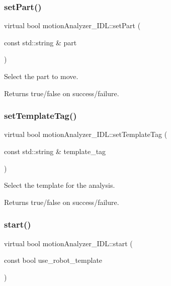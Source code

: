 \subsubsection{\texorpdfstring{set\+Part()}{setPart()}}
{\footnotesize\ttfamily virtual bool motion\+Analyzer\+\_\+\+I\+D\+L\+::set\+Part (\begin{DoxyParamCaption}\item[{const std\+::string \&}]{part }\end{DoxyParamCaption})\hspace{0.3cm}{\ttfamily [virtual]}}



Select the part to move. 

\begin{DoxyReturn}{Returns}
true/false on success/failure. 
\end{DoxyReturn}
\mbox{\label{classmotionAnalyzer__IDL_a60012ac489f03d4bd8fb272c557b0144}} 
\subsubsection{\texorpdfstring{set\+Template\+Tag()}{setTemplateTag()}}
{\footnotesize\ttfamily virtual bool motion\+Analyzer\+\_\+\+I\+D\+L\+::set\+Template\+Tag (\begin{DoxyParamCaption}\item[{const std\+::string \&}]{template\+\_\+tag }\end{DoxyParamCaption})\hspace{0.3cm}{\ttfamily [virtual]}}



Select the template for the analysis. 

\begin{DoxyReturn}{Returns}
true/false on success/failure. 
\end{DoxyReturn}
\mbox{\label{classmotionAnalyzer__IDL_aeebeafd8986b78e720eb1c6eba09207e}} 
\subsubsection{\texorpdfstring{start()}{start()}}
{\footnotesize\ttfamily virtual bool motion\+Analyzer\+\_\+\+I\+D\+L\+::start (\begin{DoxyParamCaption}\item[{const bool}]{use\+\_\+robot\+\_\+template }\end{DoxyParamCaption})\hspace{0.3cm}{\ttfamily [virtual]}}



